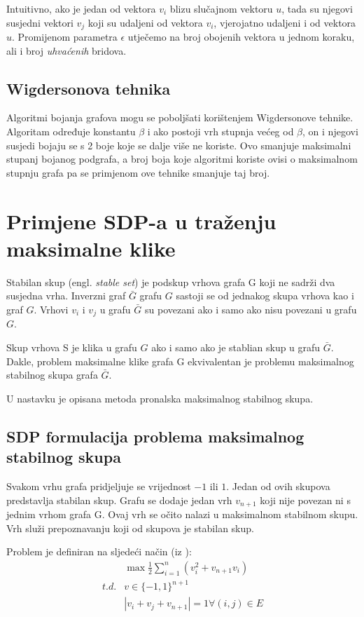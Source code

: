 \documentclass[diplomskirad]{fer}
\begin{document}
Intuitivno, ako je jedan od vektora $v_i$ blizu slučajnom vektoru $u$, tada su njegovi susjedni vektori $v_j$ koji su udaljeni od vektora $v_i$, vjerojatno
udaljeni i od vektora $u$. Promijenom parametra $\epsilon$ utječemo na broj obojenih vektora u jednom koraku, ali i broj \textit{uhvaćenih} bridova.

\section{Wigdersonova tehnika}
Algoritmi bojanja grafova mogu se poboljšati korištenjem Wigdersonove tehnike.
Algoritam određuje konstantu $\beta$ i ako postoji vrh stupnja većeg od $\beta$, on i njegovi susjedi bojaju se s 2 boje koje se dalje više ne
koriste. \cite{2002_Wigderson} Ovo smanjuje maksimalni stupanj bojanog podgrafa, a broj boja koje algoritmi koriste ovisi o maksimalnom stupnju
grafa pa se primjenom ove tehnike smanjuje taj broj.

\chapter{Primjene SDP-a u traženju maksimalne klike}
\label{pog:primjene_SDP-a_u_traženju_maksimalne_klike}

Stabilan skup (engl. \textit{stable set}) je podskup vrhova grafa G koji ne sadrži dva susjedna vrha. Inverzni graf $\bar{G}$ grafu $G$ 
sastoji se od jednakog skupa vrhova kao i graf $G$. Vrhovi $v_i$ i $v_j$ u grafu $\bar{G}$ su povezani ako i samo ako nisu povezani u grafu $G$.

Skup vrhova S je klika u grafu $G$ ako i samo ako je stablian skup u grafu $\bar{G}$. Dakle, problem maksimalne klike grafa G ekvivalentan je
problemu maksimalnog stabilnog skupa grafa $\bar{G}$. \cite{article}

U nastavku je opisana metoda pronalska maksimalnog stabilnog skupa.

\section{SDP formulacija problema maksimalnog stabilnog skupa}
Svakom vrhu grafa pridjeljuje se vrijednost $-1$ ili $1$. Jedan od ovih skupova predstavlja stabilan skup. Grafu se dodaje jedan vrh $v_{n+1}$ koji
nije povezan ni s jednim vrhom grafa G. Ovaj vrh se očito nalazi u maksimalnom stabilnom skupu. Vrh služi prepoznavanju koji od skupova
je stabilan skup.

Problem je definiran na sljedeći način (iz \cite{article}):
\begin{equation}
  \begin{split}
    & \max \frac{1}{2} \sum_{i=1}^{n} (v_i^2+v_{n+1}v_{i}) \\
    t.d. & v \in \{-1, 1\}^{n+1} \\
         & |v_i+v_j+v_{n+1}| = 1 \forall (i, j) \in E
  \end{split}   
\end{equation}
\end{document}
